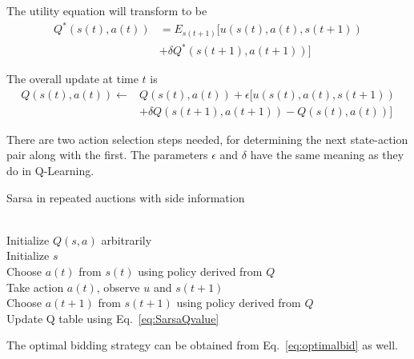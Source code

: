 The utility equation will transform to be
\begin{equation}
\begin{split}
Q^{*}(s(t),a(t)) & =E_{s(t+1)}[u(s(t),a(t),s(t+1)) \\
& +\delta Q^{*}(s(t+1),a(t+1))]
\end{split}
\end{equation}

The overall update at time $t$ is
\begin{equation}
\label{eq:SarsaQvalue}
\begin{split}
Q(s(t),a(t)) \leftarrow & Q(s(t),a(t)) +\epsilon [u(s(t),a(t),s(t+1)) \\
&+\delta Q(s(t+1),a(t+1))-Q(s(t),a(t))]
\end{split}
\end{equation}

There are two action selection steps needed, for determining the next state-action pair along with the first. The parameters $\epsilon$ and $\delta$ have the same meaning as they do in Q-Learning.
\begin{algorithm}
\caption{Sarsa in repeated auctions with side information}
\label{al:Sarsa}
\begin{algorithmic}[1]
 {}
\\Initialize $Q(s,a)$ arbitrarily
\\ \qquad Initialize $s$
\\ \qquad Choose $a(t)$ from $s(t)$ using policy derived from $Q$
\\ \qquad \qquad Take action $a(t)$, observe $u$ and $s(t+1)$
\\ \qquad \qquad Choose $a(t+1)$ from $s(t+1)$ using policy derived from $Q$
\\ \qquad \qquad Update Q table using Eq.~\ref{eq:SarsaQvalue}
\EndFor
\EndFor
\EndProcedure
\end{algorithmic}
\end{algorithm}

The optimal bidding strategy can be obtained from Eq.~\ref{eq:optimalbid} as well.

